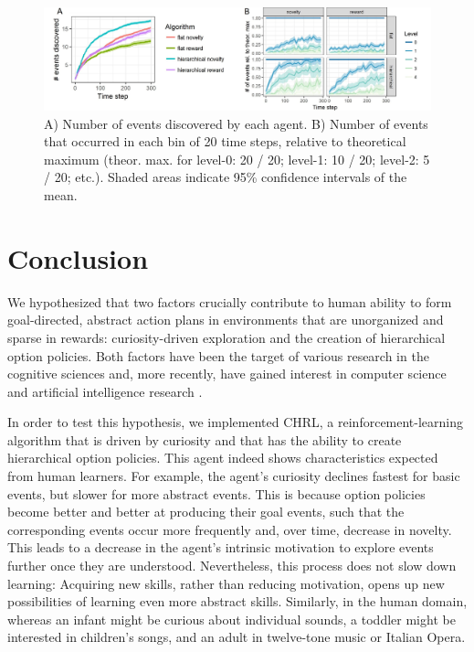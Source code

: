\documentclass{article}
\begin{document}
\begin{figure}[h]
	\centering
	\includegraphics[width=\linewidth]{CEvents.jpg}
	\caption{A) Number of events discovered by each agent. B) Number of events that occurred in each bin of 20 time steps, relative to theoretical maximum (theor. max. for level-0: 20 / 20; level-1: 10 / 20; level-2: 5 / 20; etc.). Shaded areas indicate 95\% confidence intervals of the mean.}
	\label{CEvents}
\end{figure}

\section{Conclusion}

We hypothesized that two factors crucially contribute to human ability to form goal-directed, abstract action plans in environments that are unorganized and sparse in rewards: curiosity-driven exploration and the creation of hierarchical option policies. Both factors have been the target of various research in the cognitive sciences and, more recently, have gained interest in computer science and artificial intelligence research \cite{botvinick_model-based_2014, frank_mechanisms_2012, gopnik_scientific_2012, machado_learning_2016, anderson_act:_1996, collins_reasoning_2012, miller_integrative_2001, schmidhuber_formal_2010, pathak_curiosity-driven_2017, kulkarni_hierarchical_2016}.

In order to test this hypothesis, we implemented CHRL, a reinforcement-learning algorithm that is driven by curiosity and that has the ability to create hierarchical option policies. This agent indeed shows characteristics expected from human learners. For example, the agent's curiosity declines fastest for basic events, but slower for more abstract events. This is because option policies become better and better at producing their goal events, such that the corresponding events occur more frequently and, over time, decrease in novelty. This leads to a decrease in the agent's intrinsic motivation to explore events further once they are understood. Nevertheless, this process does not slow down learning: Acquiring new skills, rather than reducing motivation, opens up new possibilities of learning even more abstract skills. Similarly, in the human domain, whereas an infant might be curious about individual sounds, a toddler might be interested in children's songs, and an adult in twelve-tone music or Italian Opera. 
\end{document}

